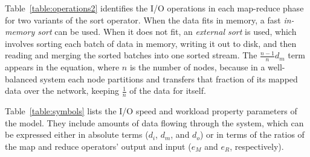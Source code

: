 

Table~\ref{table:operations2} identifies the I/O operations in each
map-reduce phase for two variants of the sort operator.  When the data
fits in memory, a fast {\it in-memory sort} can be used. When it does
not fit, an {\it external sort} is used, which involves sorting each
batch of data in memory, writing it out to disk, and then reading and
merging the sorted batches into one sorted stream. The $\frac{n-1}{n}
d_m$ term appears in the equation, where $n$ is the number of nodes,
because in a well-balanced system each node partitions and transfers
that fraction of its mapped data over the network, keeping
$\frac{1}{n}$ of the data for itself.




Table~\ref{table:symbols} lists the I/O speed and workload property
parameters of the model.
They include
amounts of data flowing through the system, which
can be expressed either in absolute terms ($d_i$, $d_m$, and $d_o$) or in
terms of the ratios of the map and reduce operators' output and
input ($e_M$ and $e_R$, respectively).



